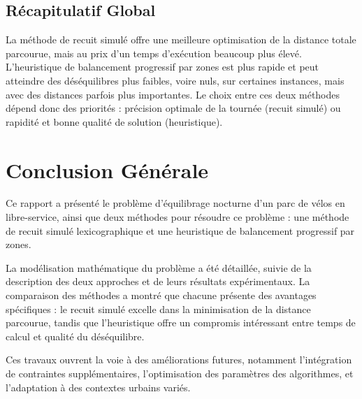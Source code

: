 \documentclass{article}
\begin{document}
\vspace{1cm}

\subsection{Récapitulatif Global}

La méthode de recuit simulé offre une meilleure optimisation de la distance totale parcourue, mais au prix d'un temps d'exécution beaucoup plus élevé. L'heuristique de balancement progressif par zones est plus rapide et peut atteindre des déséquilibres plus faibles, voire nuls, sur certaines instances, mais avec des distances parfois plus importantes. Le choix entre ces deux méthodes dépend donc des priorités : précision optimale de la tournée (recuit simulé) ou rapidité et bonne qualité de solution (heuristique).

\section{Conclusion Générale}

Ce rapport a présenté le problème d'équilibrage nocturne d'un parc de vélos en libre-service, ainsi que deux méthodes pour résoudre ce problème : une méthode de recuit simulé lexicographique et une heuristique de balancement progressif par zones.

La modélisation mathématique du problème a été détaillée, suivie de la description des deux approches et de leurs résultats expérimentaux. La comparaison des méthodes a montré que chacune présente des avantages spécifiques : le recuit simulé excelle dans la minimisation de la distance parcourue, tandis que l'heuristique offre un compromis intéressant entre temps de calcul et qualité du déséquilibre.

Ces travaux ouvrent la voie à des améliorations futures, notamment l'intégration de contraintes supplémentaires, l'optimisation des paramètres des algorithmes, et l'adaptation à des contextes urbains variés.
\end{document}
